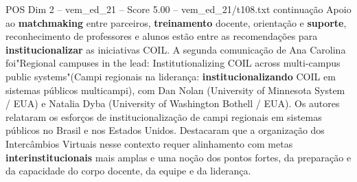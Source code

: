 \begin{textsample}{POS Dim 2 – vem\_ed\_21 – Score 5.00 – vem\_ed\_21/t108.txt}  \label{ex:f2_pos_168}
continuação Apoio ao \textbf{matchmaking} entre parceiros, \textbf{treinamento} docente, orientação e \textbf{suporte}, reconhecimento de professores e alunos estão entre as recomendações para \textbf{institucionalizar} as iniciativas COIL.
A segunda comunicação de Ana Carolina foi"Regional campuses in the lead: Institutionalizing COIL across multi-campus public systems"(Campi regionais na liderança: \textbf{institucionalizando} COIL em sistemas públicos multicampi), com Dan Nolan (University of Minnesota System / EUA) e Natalia Dyba (University of Washington Bothell / EUA).
Os autores relataram os esforços de institucionalização de campi regionais em sistemas públicos no Brasil e nos Estados Unidos.
Destacaram que a organização dos Intercâmbios Virtuais nesse contexto requer alinhamento com metas \textbf{interinstitucionais} mais amplas e uma noção dos pontos fortes, da preparação e da capacidade do corpo docente, da equipe e da liderança.

\end{textsample}
